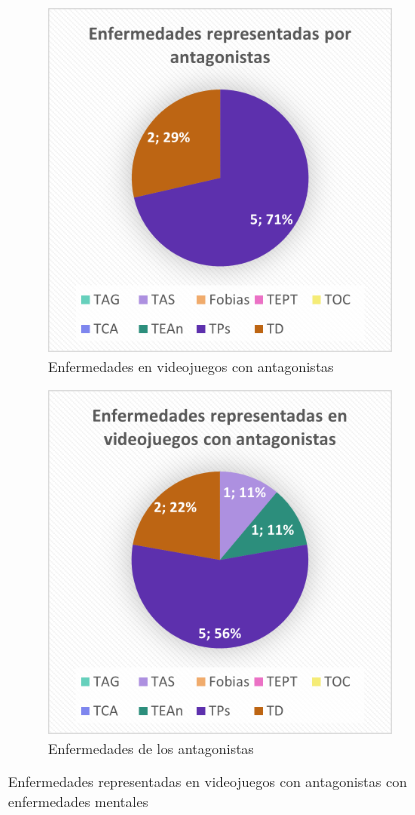 \documentclass[12pt, a4paper,twoside,titlepage]{book}
\begin{document}
\begin{figure}
\centering
\begin{subfigure}{.5\textwidth}
  \centering
  \includegraphics[width=.95\linewidth]{Graficas estudio/G13; Enfanta.png}
  \caption{Enfermedades en videojuegos con antagonistas}
\end{subfigure}%
\begin{subfigure}{.5\textwidth}
  \centering
  \includegraphics[width=.95\linewidth]{Graficas estudio/G14; Enfvidanta.png}
  \caption{Enfermedades de los antagonistas}
\end{subfigure}
\caption{Enfermedades representadas en videojuegos con antagonistas con enfermedades mentales}
\label{fig:ESTEnfantagonistas}
\end{figure}
\end{document}
